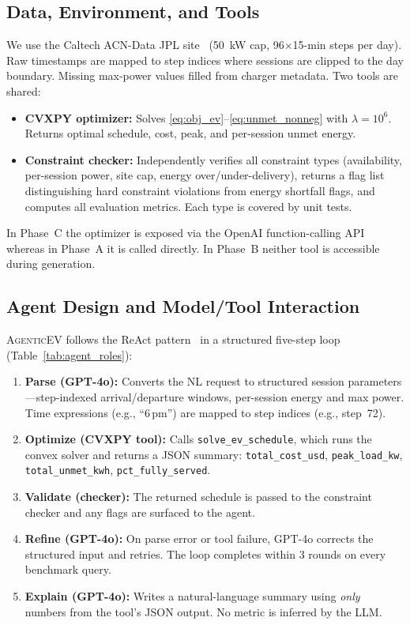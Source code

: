 \documentclass{article}
\newcommand{\modelname}{\textsc{AgenticEV}}
\newcommand{\tool}[1]{\texttt{#1}}
\begin{document}
\subsection{Data, Environment, and Tools}

We use the Caltech ACN-Data JPL site~\cite{acndata} (50~kW cap, 96$\times$15-min steps per day). Raw timestamps are mapped to step indices where sessions are clipped to the day boundary. Missing max-power values filled from charger metadata. Two tools are shared:
\begin{itemize}
  \item \textbf{CVXPY optimizer:} Solves \eqref{eq:obj_ev}--\eqref{eq:unmet_nonneg} with $\lambda=10^6$. Returns optimal schedule, cost, peak, and per-session unmet energy.
  \item \textbf{Constraint checker:} Independently verifies all constraint types (availability, per-session power, site cap, energy over/under-delivery), returns a flag list distinguishing hard constraint violations from energy shortfall flags, and computes all evaluation metrics. Each type is covered by unit tests.
\end{itemize}
In Phase~C the optimizer is exposed via the OpenAI function-calling API whereas in Phase~A it is called directly. In Phase~B neither tool is accessible during generation.

\subsection{Agent Design and Model/Tool Interaction}

\modelname{} follows the ReAct pattern~\cite{yao2022react} in a structured five-step loop (Table~\ref{tab:agent_roles}):
\begin{enumerate}
  \item \textbf{Parse (GPT-4o):} Converts the NL request to structured session parameters—step-indexed arrival/departure windows, per-session energy and max power. Time expressions (e.g., ``6\,pm'') are mapped to step indices (e.g., step~72).
  \item \textbf{Optimize (CVXPY tool):} Calls \tool{solve\_ev\_schedule}, which runs the convex solver and returns a JSON summary: \texttt{total\_cost\_usd}, \texttt{peak\_load\_kw}, \texttt{total\_unmet\_kwh}, \texttt{pct\_fully\_served}.
  \item \textbf{Validate (checker):} The returned schedule is passed to the constraint checker and any flags are surfaced to the agent.
  \item \textbf{Refine (GPT-4o):} On parse error or tool failure, GPT-4o corrects the structured input and retries. The loop completes within 3 rounds on every benchmark query.
  \item \textbf{Explain (GPT-4o):} Writes a natural-language summary using \emph{only} numbers from the tool's JSON output. No metric is inferred by the LLM.
\end{enumerate}
\end{document}
